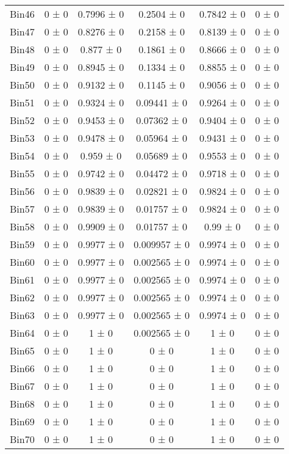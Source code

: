 \begin{tabular}{@{\extracolsep{4pt}}lccccc@{}}
     Bin46 & 0 ± 0 & 0.7996 ± 0 & 0.2504 ± 0 & 0.7842 ± 0 & 0 ± 0 \\ 
     Bin47 & 0 ± 0 & 0.8276 ± 0 & 0.2158 ± 0 & 0.8139 ± 0 & 0 ± 0 \\ 
     Bin48 & 0 ± 0 & 0.877 ± 0 & 0.1861 ± 0 & 0.8666 ± 0 & 0 ± 0 \\ 
     Bin49 & 0 ± 0 & 0.8945 ± 0 & 0.1334 ± 0 & 0.8855 ± 0 & 0 ± 0 \\ 
     Bin50 & 0 ± 0 & 0.9132 ± 0 & 0.1145 ± 0 & 0.9056 ± 0 & 0 ± 0 \\ 
     Bin51 & 0 ± 0 & 0.9324 ± 0 & 0.09441 ± 0 & 0.9264 ± 0 & 0 ± 0 \\ 
     Bin52 & 0 ± 0 & 0.9453 ± 0 & 0.07362 ± 0 & 0.9404 ± 0 & 0 ± 0 \\ 
     Bin53 & 0 ± 0 & 0.9478 ± 0 & 0.05964 ± 0 & 0.9431 ± 0 & 0 ± 0 \\ 
     Bin54 & 0 ± 0 & 0.959 ± 0 & 0.05689 ± 0 & 0.9553 ± 0 & 0 ± 0 \\ 
     Bin55 & 0 ± 0 & 0.9742 ± 0 & 0.04472 ± 0 & 0.9718 ± 0 & 0 ± 0 \\ 
     Bin56 & 0 ± 0 & 0.9839 ± 0 & 0.02821 ± 0 & 0.9824 ± 0 & 0 ± 0 \\ 
     Bin57 & 0 ± 0 & 0.9839 ± 0 & 0.01757 ± 0 & 0.9824 ± 0 & 0 ± 0 \\ 
     Bin58 & 0 ± 0 & 0.9909 ± 0 & 0.01757 ± 0 & 0.99 ± 0 & 0 ± 0 \\ 
     Bin59 & 0 ± 0 & 0.9977 ± 0 & 0.009957 ± 0 & 0.9974 ± 0 & 0 ± 0 \\ 
     Bin60 & 0 ± 0 & 0.9977 ± 0 & 0.002565 ± 0 & 0.9974 ± 0 & 0 ± 0 \\ 
     Bin61 & 0 ± 0 & 0.9977 ± 0 & 0.002565 ± 0 & 0.9974 ± 0 & 0 ± 0 \\ 
     Bin62 & 0 ± 0 & 0.9977 ± 0 & 0.002565 ± 0 & 0.9974 ± 0 & 0 ± 0 \\ 
     Bin63 & 0 ± 0 & 0.9977 ± 0 & 0.002565 ± 0 & 0.9974 ± 0 & 0 ± 0 \\ 
     Bin64 & 0 ± 0 & 1 ± 0 & 0.002565 ± 0 & 1 ± 0 & 0 ± 0 \\ 
     Bin65 & 0 ± 0 & 1 ± 0 & 0 ± 0 & 1 ± 0 & 0 ± 0 \\ 
     Bin66 & 0 ± 0 & 1 ± 0 & 0 ± 0 & 1 ± 0 & 0 ± 0 \\ 
     Bin67 & 0 ± 0 & 1 ± 0 & 0 ± 0 & 1 ± 0 & 0 ± 0 \\ 
     Bin68 & 0 ± 0 & 1 ± 0 & 0 ± 0 & 1 ± 0 & 0 ± 0 \\ 
     Bin69 & 0 ± 0 & 1 ± 0 & 0 ± 0 & 1 ± 0 & 0 ± 0 \\ 
     Bin70 & 0 ± 0 & 1 ± 0 & 0 ± 0 & 1 ± 0 & 0 ± 0 \\ 

\end{tabular}
